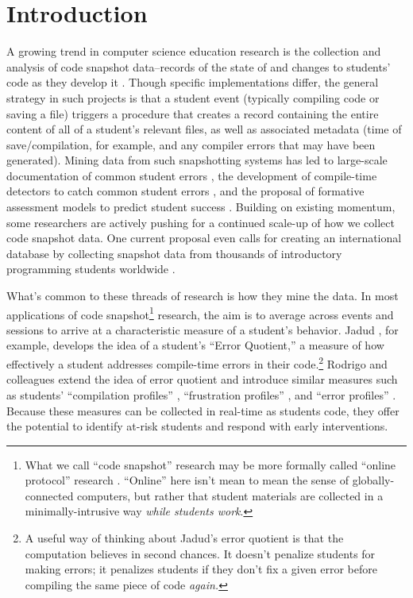 \section{Introduction}\label{introduction}

A growing trend in computer science education research is the collection and analysis of code snapshot data--records of the state of and changes to students' code as they develop it \cite{jadud_methods_2006,rodrigo_analyzing_2009,spacco_marmoset_2006}. Though specific implementations differ, the general strategy in such projects is that a student event (typically compiling code or saving a file) triggers a procedure that creates a record containing the entire content of all of a student's relevant files, as well as associated metadata (time of save/compilation, for example, and any compiler errors that may have been generated). Mining data from such snapshotting systems has led to large-scale documentation of common student errors \cite{spacco_marmoset_2006}, the development of compile-time detectors to catch common student errors \cite{spacco_software_2005}, and the proposal of formative assessment models to predict student success \cite{jadud_methods_2006,tabanao_predicting_2011}. Building on existing momentum, some researchers are actively pushing for a continued scale-up of how we collect code snapshot data. One current proposal even calls for creating an international database by collecting snapshot data from thousands of introductory programming students worldwide \cite{kolling_building_2012}.

What's common to these threads of research is how they mine the data. In
most applications of code snapshot\footnote{What we call ``code
  snapshot'' research may be more formally called ``online protocol''
  research \cite{jadud_methods_2006,rodrigo_analyzing_2009}. ``Online'' here isn't mean to mean
  the sense of globally-connected computers, but rather that student
  materials are collected in a minimally-intrusive way \emph{while
  students work}.} research, the aim is to average across events and
sessions to arrive at a characteristic measure of a student's behavior.
Jadud \cite{jadud_methods_2006}, for example, develops the idea of a student's ``Error
Quotient,'' a measure of how effectively a student addresses
compile-time errors in their code.\footnote{A useful way of thinking
  about Jadud's \cite{jadud_methods_2006} error quotient is that the computation believes
  in second chances. It doesn't penalize students for making errors; it
  penalizes students if they don't fix a given error before compiling
  the same piece of code \emph{again.}} Rodrigo and colleagues extend
the idea of error quotient and introduce similar
measures such as students' ``compilation profiles'' \cite{rodrigo_analyzing_2009}, ``frustration profiles'' \cite{rodrigo_affective_2009}, and ``error
profiles'' \cite{tabanao_predicting_2011}. Because these measures can be
collected in real-time as students code, they offer the potential to
identify at-risk students and respond with early
interventions.

